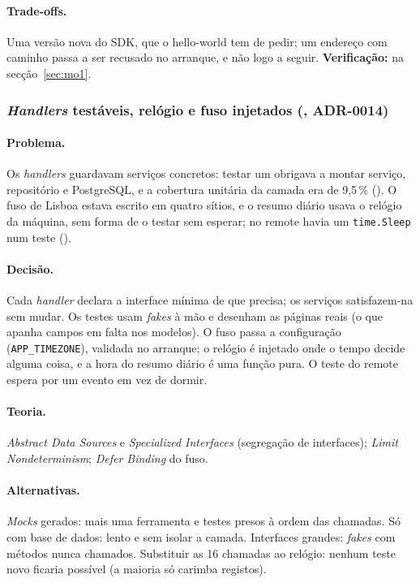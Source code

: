 \paragraph{Trade-offs.}
Uma versão nova do SDK, que o hello-world tem de pedir; um endereço com caminho passa a ser recusado no arranque,
e não logo a seguir. \textbf{Verificação:}  na secção~\ref{sec:mo1}.

\subsubsection{\emph{Handlers} testáveis, relógio e fuso injetados (, ADR-0014)}
\label{sec:d14}

\paragraph{Problema.}
Os \emph{handlers} guardavam serviços concretos: testar um obrigava a montar serviço, repositório e PostgreSQL, e a
cobertura unitária da camada era de 9,5\,\% (). O fuso de Lisboa estava escrito em quatro sítios, e o resumo diário
usava o relógio da máquina, sem forma de o testar sem esperar; no remote havia um \texttt{time.Sleep} num teste
().

\paragraph{Decisão.}
Cada \emph{handler} declara a interface mínima de que precisa; os serviços satisfazem-na sem mudar. Os testes usam
\emph{fakes} à mão e desenham as páginas reais (o que apanha campos em falta nos modelos). O fuso passa a
configuração (\texttt{APP\_TIMEZONE}), validada no arranque; o relógio é injetado onde o tempo decide alguma coisa, e
a hora do resumo diário é uma função pura. O teste do remote espera por um evento em vez de dormir.

\paragraph{Teoria.}
\emph{Abstract Data Sources} e \emph{Specialized Interfaces} (segregação de interfaces); \emph{Limit
Nondeterminism}; \emph{Defer Binding} do fuso.

\paragraph{Alternativas.}
\emph{Mocks} gerados: mais uma ferramenta e testes presos à ordem das chamadas. Só com base de dados: lento e
sem isolar a camada. Interfaces grandes: \emph{fakes} com métodos nunca chamados. Substituir as 16 chamadas ao
relógio: nenhum teste novo ficaria possível (a maioria só carimba registos).

